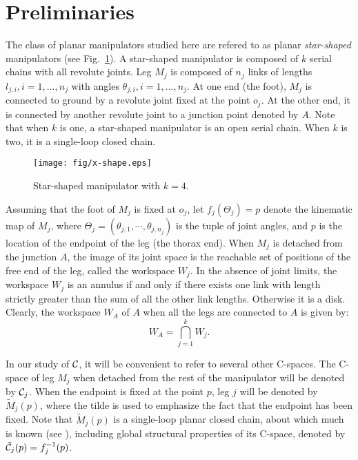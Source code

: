 \documentclass[twocolumn]{IEEEtran}
\begin{document}
\section{Preliminaries}
\label{section1}

The class of planar manipulators studied here are refered to as
planar {\sl star-shaped} manipulators (see Fig.~\ref{X-shape}). A
star-shaped manipulator is composed of $k$ serial chains with all
revolute joints.  Leg $M_j$ is composed of $n_j$ links of lengths
$l_{j,i}, i=1,...,n_j$  with angles $\theta_{j,i}, i=1,...,n_j$. At
one end (the foot), $M_j$ is connected to ground by a revolute joint
fixed at the point $o_j$. At the other end, it is connected by
another revolute joint to a junction point denoted by $A$. Note that
when $k$ is one, a star-shaped manipulator is an open serial chain.
When $k$ is two, it is a single-loop closed chain.
\begin{figure}
  \centering
  \texttt{[image: fig/x-shape.eps]}
  \caption{Star-shaped manipulator with $k=4$.}
  \label{X-shape}
\end{figure}

Assuming that the foot of $M_j$ is fixed at $o_j$, let
$f_j(\Theta_j)=p$ denote the kinematic map of $M_j$, where $\Theta_j
= (\theta_{j,1}, \cdots, \theta_{j,n_j})$ is the tuple of joint
angles, and $p$ is the location of the endpoint of the leg (the
thorax end). When $M_j$ is detached from the junction $A$, the image
of its joint space is the reachable set of positions of the free end
of the leg, called the workspace $W_j$. In the absence of joint limits,
the workspace $W_j$ is an
annulus if and only if there exists one link with length strictly
greater than the sum of all the other link lengths. Otherwise it is
a disk. Clearly, the workspace $W_A$ of $A$ when all the legs are
connected to $A$ is given by:
\begin{equation}
\label{eq:defW}
   W_A = \bigcap_{j=1}^k W_j.
\end{equation}

In our study of ${\cal C}$, it will be convenient to refer to
several other C-spaces. The C-space of leg $M_j$ when detached from
the rest of the manipulator will be denoted by ${\cal C}_j$. When
the endpoint is fixed at the point $p$, leg $j$ will be denoted by
$\tilde M_j(p)$, where the tilde is used to emphasize the fact that
the endpoint has been fixed. Note that $\tilde M_j(p)$ is a
single-loop planar closed chain, about which much is known (see
\cite{TM02}), including global structural properties of its C-space,
denoted by $\tilde {\cal C}_j(p) = f_j^{-1}(p)$.
\end{document}
